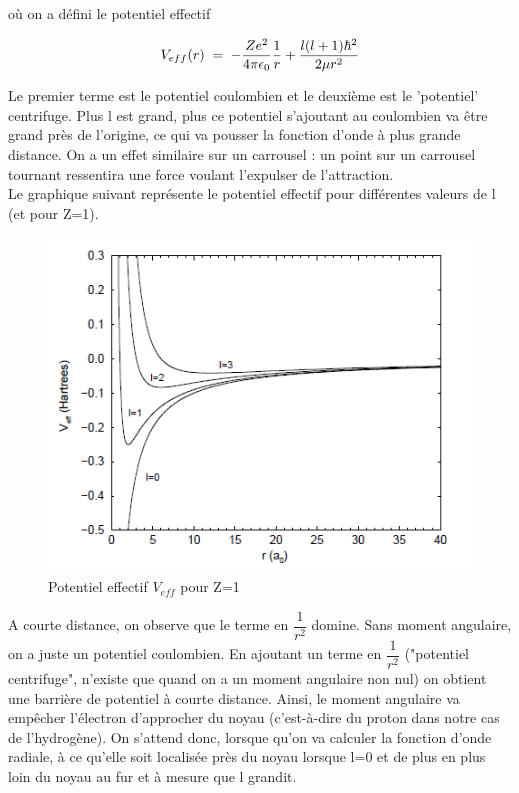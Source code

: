 où on a défini le potentiel effectif

\begin{equation*}
    V_{eff}(r)\; = \; -\dfrac{Ze^2}{4\pi \epsilon_0}\dfrac{1}{r}+\dfrac{l(l+1)\hbar^2}{2\mu r^2}
\end{equation*}

\vspace{0.2cm}

Le premier terme est le potentiel coulombien et le deuxième est le 'potentiel' centrifuge. Plus l est grand, plus ce potentiel s'ajoutant au coulombien va être grand près de l'origine, ce qui va pousser la fonction d'onde à plus grande distance. On a un effet similaire sur un carrousel : un point sur un carrousel tournant ressentira une force voulant l'expulser de l'attraction.  \\

Le graphique suivant représente le potentiel effectif pour différentes valeurs de l (et pour Z=1). 

\begin{figure}[tph]
    \centering
    \includegraphics[scale=0.80]{Images2/rad.PNG}
    \caption{Potentiel effectif $V_{eff}$ pour Z=1}
    \label{fig:potentieleffectif}
\end{figure}

A courte distance, on observe que le terme en $\dfrac{1}{r^2}$ domine. Sans moment angulaire, on a juste un potentiel coulombien. En ajoutant un terme en $\dfrac{1}{r^2}$ ("potentiel centrifuge", n'existe que quand on a un moment angulaire non nul) on obtient une barrière de potentiel à courte distance. Ainsi, le moment angulaire va empêcher l'électron d'approcher du noyau (c'est-à-dire du proton dans notre cas de l'hydrogène). On s'attend donc, lorsque qu'on va calculer la fonction d'onde radiale, à ce qu'elle soit localisée près du noyau lorsque l=0 et de plus en plus loin du noyau au fur et à mesure que l grandit. 


